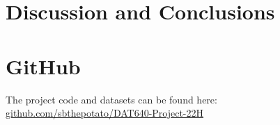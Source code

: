 \documentclass[sigconf]{acmart}
\begin{document}
\section{Discussion and Conclusions}









\newpage
\appendix
\section{GitHub}
The project code and datasets can be found here:
\href{https://github.com/sbthepotato/DAT640-Project-22H}{github.com/sbthepotato/DAT640-Project-22H}


\end{document}
